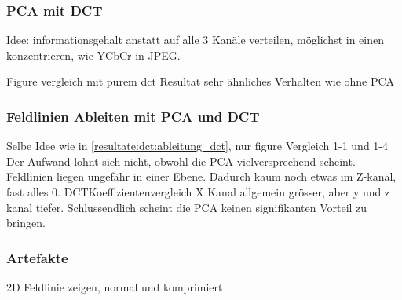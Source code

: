 \subsubsection{PCA mit DCT}
Idee: informationsgehalt anstatt auf alle 3 Kanäle verteilen, möglichst in einen konzentrieren, wie YCbCr in JPEG.

Figure vergleich mit purem dct
Resultat sehr ähnliches Verhalten wie ohne PCA

\subsubsection{Feldlinien Ableiten mit PCA und DCT}
Selbe Idee wie in \ref{resultate:dct:ableitung_dct}, nur 
figure Vergleich 1-1 und 1-4
Der Aufwand lohnt sich nicht, obwohl die PCA vielversprechend scheint. Feldlinien liegen ungefähr in einer Ebene. Dadurch kaum noch etwas im Z-kanal, fast alles 0.
DCTKoeffizientenvergleich
X Kanal allgemein grösser, aber y und z kanal tiefer. Schlussendlich scheint die PCA keinen signifikanten Vorteil zu bringen.


\subsubsection{Artefakte}
2D Feldlinie zeigen, normal und komprimiert
